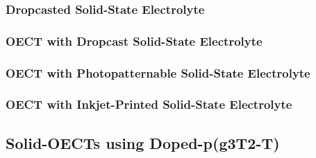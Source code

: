 \subsubsection{Dropcasted Solid-State Electrolyte}

\subsubsection{OECT with Dropcast Solid-State Electrolyte}

\subsubsection{OECT with Photopatternable Solid-State Electrolyte}

\subsubsection{OECT with Inkjet-Printed Solid-State Electrolyte}


\subsection{Solid-OECTs using Doped-p(g3T2-T)}





